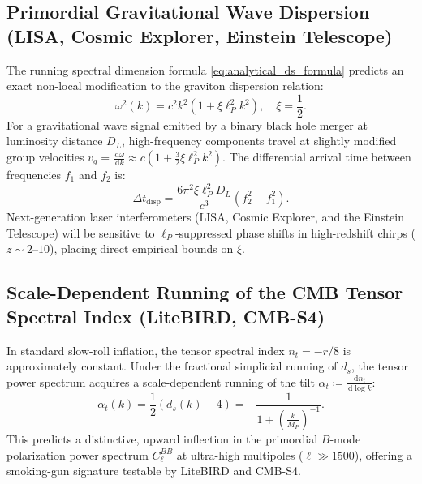 \documentclass[11pt,a4paper,reqno]{amsart}
\theoremstyle{definition}
\numberwithin{equation}{section}
\newcommand{\dif}{\,\mathrm{d}}
\begin{document}
\subsection{Primordial Gravitational Wave Dispersion (LISA, Cosmic Explorer, Einstein Telescope)}
The running spectral dimension formula \eqref{eq:analytical_ds_formula} predicts an exact non-local modification to the graviton dispersion relation:
\begin{equation}
    \label{eq:graviton_dispersion}
    \omega^2(k) = c^2 k^2 \left( 1 + \xi \ell_P^2 k^2 \right), \quad \xi = \frac{1}{2}.
\end{equation}
For a gravitational wave signal emitted by a binary black hole merger at luminosity distance $D_L$, high-frequency components travel at slightly modified group velocities $v_g = \frac{\dif \omega}{\dif k} \approx c(1 + \frac{3}{2}\xi \ell_P^2 k^2)$. The differential arrival time between frequencies $f_1$ and $f_2$ is:
\begin{equation}
    \Delta t_{\mathrm{disp}} = \frac{6 \pi^2 \xi \ell_P^2 D_L}{c^3} \left( f_2^2 - f_1^2 \right).
\end{equation}
Next-generation laser interferometers (LISA, Cosmic Explorer, and the Einstein Telescope) will be sensitive to $\ell_P$-suppressed phase shifts in high-redshift chirps ($z \sim 2$--$10$), placing direct empirical bounds on $\xi$.

\subsection{Scale-Dependent Running of the CMB Tensor Spectral Index (LiteBIRD, CMB-S4)}
In standard slow-roll inflation, the tensor spectral index $n_t = -r/8$ is approximately constant. Under the fractional simplicial running of $d_s$, the tensor power spectrum acquires a scale-dependent running of the tilt $\alpha_t \coloneqq \frac{\dif n_t}{\dif \log k}$:
\begin{equation}
    \alpha_t(k) = \frac{1}{2} \left( d_s(k) - 4 \right) = -\frac{1}{1 + \left(\frac{k}{M_P}\right)^{-1}}.
\end{equation}
This predicts a distinctive, upward inflection in the primordial $B$-mode polarization power spectrum $C_\ell^{BB}$ at ultra-high multipoles ($\ell \gg 1500$), offering a smoking-gun signature testable by LiteBIRD and CMB-S4.
\end{document}

